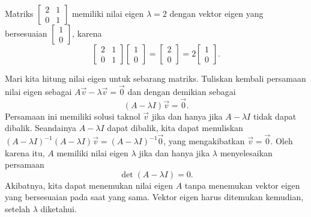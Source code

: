 \begin{example}
Matriks $\left[ \begin{smallmatrix}
2 & 1 \\
0 & 1
\end{smallmatrix} \right]$ memiliki nilai eigen $\lambda = 2$ dengan
vektor eigen
yang bersesuaian $\left[ \begin{smallmatrix}
1 \\ 0
\end{smallmatrix} \right]$, karena
\begin{equation*}
\begin{bmatrix}
2 & 1 \\
0 & 1
\end{bmatrix}
\begin{bmatrix}
1 \\ 0
\end{bmatrix}
=
\begin{bmatrix}
2 \\
0
\end{bmatrix}
=
2
\begin{bmatrix}
1 \\ 0
\end{bmatrix} .
\end{equation*}
\end{example}

Mari kita hitung nilai eigen untuk sebarang matriks.
Tuliskan kembali persamaan nilai eigen sebagai $A\vec{v}-\lambda \vec{v}=\vec{0}$
dan dengan demikian sebagai
\begin{equation*}
(A - \lambda I)\vec{v} = \vec{0} .
\end{equation*}
Persamaan ini memiliki solusi taknol $\vec{v}$ jika dan hanya jika
$A - \lambda I$ tidak dapat dibalik.
Seandainya $A - \lambda I$ dapat dibalik,
kita dapat menuliskan
${(A - \lambda I)}^{-1}(A - \lambda I)\vec{v} = {(A-\lambda I)}^{-1}\vec{0}$,
yang mengakibatkan $\vec{v} = \vec{0}$.  Oleh karena itu,
$A$ memiliki
nilai eigen $\lambda$ jika dan hanya jika $\lambda$ menyelesaikan persamaan
\begin{equation*}
\det (A-\lambda I) = 0 .
\end{equation*}
Akibatnya, kita dapat menemukan nilai eigen $A$ tanpa
menemukan vektor eigen yang bersesuaian pada saat yang sama.  Vektor eigen harus
ditemukan kemudian, setelah $\lambda$ diketahui.

